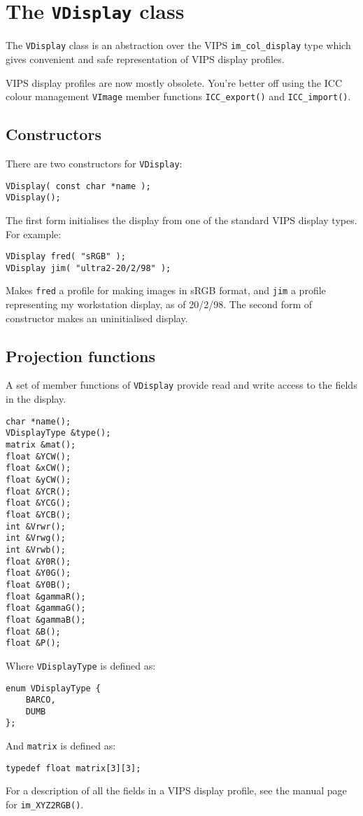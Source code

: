 \section{The \texttt{VDisplay} class}

The \verb+VDisplay+ class is an abstraction over the VIPS \verb+im_col_display+
type which gives convenient and safe representation of VIPS display profiles.

VIPS display profiles are now mostly obsolete. You're better off using the
ICC colour management \verb+VImage+ member functions \verb+ICC_export()+ and 
\verb+ICC_import()+.

\subsection{Constructors}

There are two constructors for \verb+VDisplay+:

\begin{verbatim}
VDisplay( const char *name );
VDisplay();
\end{verbatim}

The first form initialises the display from one of the standard VIPS display
types. For example:

\begin{verbatim}
VDisplay fred( "sRGB" );
VDisplay jim( "ultra2-20/2/98" );
\end{verbatim}

Makes \verb+fred+ a profile for making images in sRGB format, and \verb+jim+ a
profile representing my workstation display, as of 20/2/98.  The second form
of constructor makes an uninitialised display.

\subsection{Projection functions}

A set of member functions of \verb+VDisplay+ provide read and write access to
the fields in the display.

\begin{verbatim}
char *name();
VDisplayType &type();
matrix &mat();
float &YCW();
float &xCW();
float &yCW();
float &YCR();
float &YCG();
float &YCB();
int &Vrwr();
int &Vrwg();
int &Vrwb();
float &Y0R();
float &Y0G();
float &Y0B();
float &gammaR();
float &gammaG();
float &gammaB();
float &B();
float &P();
\end{verbatim}

Where \verb+VDisplayType+ is defined as:

\begin{verbatim}
enum VDisplayType {
    BARCO,
    DUMB
};
\end{verbatim}

And \verb+matrix+ is defined as:

\begin{verbatim}
typedef float matrix[3][3];
\end{verbatim}

For a description of all the fields in a VIPS display profile, see the manual
page for \verb+im_XYZ2RGB()+.
